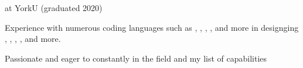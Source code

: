 

\begin{cvparagraph}
        \begin{summaryitems}
            \item \begin{center}  at YorkU (graduated 2020)\end{center}
            \item \begin{center} Experience with numerous coding languages such as , , , , and more in designging , , , ,  and more.\end{center}
            \item \begin{center} Passionate and eager to constantly  in the field and  my list of capabilities \end{center}
        \end{summaryitems}
\end{cvparagraph}

\vspace{-3mm}
